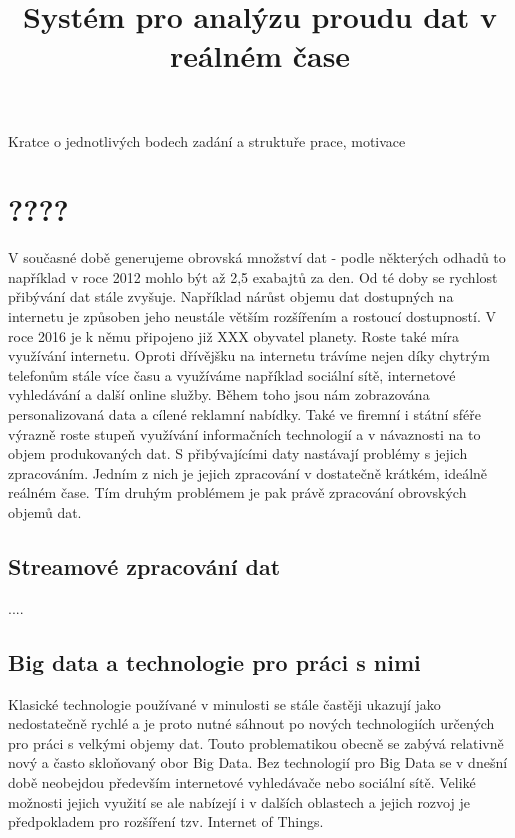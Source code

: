 \documentclass[thesis=B,czech]{FITthesis}[2012/06/26]
\title{Systém pro analýzu proudu dat v reálném čase}
\begin{document}

\begin{introduction}
	Kratce o jednotlivých bodech zadání a struktuře prace, motivace
	
\end{introduction}

%


\chapter{????}
	V současné době generujeme obrovská množství dat - podle některých odhadů to například v roce 2012 mohlo být až 2,5 exabajtů za den\cite{citace1}. Od té doby se rychlost přibývání dat stále zvyšuje. Například nárůst objemu dat dostupných na internetu je způsoben jeho neustále větším rozšířením a rostoucí dostupností. V  roce 2016 je k němu připojeno již XXX obyvatel planety\cite{citace2}. Roste také míra využívání internetu. Oproti dřívějšku na internetu trávíme nejen díky chytrým telefonům stále více času a využíváme například sociální sítě, internetové vyhledávání a další online služby. Během toho jsou nám zobrazována personalizovaná data a cílené reklamní nabídky. Také ve firemní i státní sféře výrazně roste stupeň využívání informačních technologií a v návaznosti na to objem produkovaných dat. 	S přibývajícími daty nastávají problémy s jejich zpracováním. Jedním z nich je jejich zpracování v dostatečně krátkém, ideálně reálném čase. Tím druhým problémem je pak právě zpracování obrovských objemů dat. 
		 
\section{Streamové zpracování dat}	
	....


\section{Big data a technologie pro práci s nimi}
	Klasické technologie používané v minulosti se stále častěji ukazují jako nedostatečně rychlé a je proto nutné sáhnout po nových technologiích určených pro práci s velkými objemy dat. Touto problematikou obecně se zabývá relativně nový a často skloňovaný obor Big Data. Bez technologií pro Big Data se v dnešní době neobejdou především internetové vyhledávače nebo sociální sítě\cite{4}. Veliké možnosti jejich využití se ale nabízejí i v dalších oblastech a jejich rozvoj je předpokladem pro rozšíření tzv. Internet of Things\cite{3}.  
\end{document}
